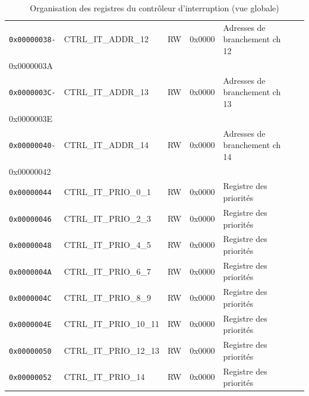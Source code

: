\begin{table}[H]
\begin{tabular}{llllll}
		\rhline
		\texttt{0x00000038-} & CTRL\_IT\_ADDR\_12     & RW            & 0x0000         & Adresses de branchement ch 12        \\
		{0x0000003A}         &                        &               &                &                                      \\
		\rhline
		\texttt{0x0000003C-} & CTRL\_IT\_ADDR\_13     & RW            & 0x0000         & Adresses de branchement ch 13        \\
		{0x0000003E}         &                        &               &                &                                      \\
		\rhline
		\texttt{0x00000040-} & CTRL\_IT\_ADDR\_14     & RW            & 0x0000         & Adresses de branchement ch 14        \\
		{0x00000042}         &                        &               &                &                                      \\
		\rhline
		\texttt{0x00000044}  & CTRL\_IT\_PRIO\_0\_1   & RW            & 0x0000         & Registre des priorités               \\
		\rhline
		\texttt{0x00000046}  & CTRL\_IT\_PRIO\_2\_3   & RW            & 0x0000         & Registre des priorités               \\
		\rhline
		\texttt{0x00000048}  & CTRL\_IT\_PRIO\_4\_5   & RW            & 0x0000         & Registre des priorités               \\
		\rhline
		\texttt{0x0000004A}  & CTRL\_IT\_PRIO\_6\_7   & RW            & 0x0000         & Registre des priorités               \\
		\rhline
		\texttt{0x0000004C}  & CTRL\_IT\_PRIO\_8\_9   & RW            & 0x0000         & Registre des priorités               \\
		\rhline
		\texttt{0x0000004E}  & CTRL\_IT\_PRIO\_10\_11 & RW            & 0x0000         & Registre des priorités               \\
		\rhline
		\texttt{0x00000050}  & CTRL\_IT\_PRIO\_12\_13 & RW            & 0x0000         & Registre des priorités               \\
		\rhline
		\texttt{0x00000052}  & CTRL\_IT\_PRIO\_14     & RW            & 0x0000         & Registre des priorités               \\
		\hline
	\end{tabular}
	\caption{Organisation des registres du contrôleur d'interruption (vue globale)}
	\label{tab:reg_map}
\end{table}

